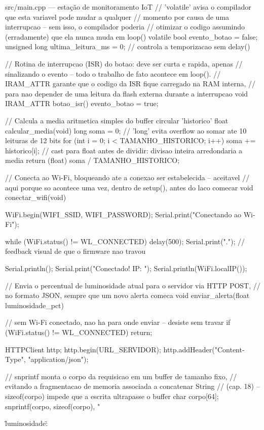 \begin{codigoc}{src/main.cpp — estação de monitoramento IoT}
// 'volatile' avisa o compilador que esta variavel pode mudar a qualquer
// momento por causa de uma interrupcao -- sem isso, o compilador poderia
// otimizar o codigo assumindo (erradamente) que ela nunca muda em loop()
volatile bool evento_botao = false;
unsigned long ultima_leitura_ms = 0;   // controla a temporizacao sem delay()

// Rotina de interrupcao (ISR) do botao: deve ser curta e rapida, apenas
// sinalizando o evento -- todo o trabalho de fato acontece em loop().
// IRAM_ATTR garante que o codigo da ISR fique carregado na RAM interna,
// para nao depender de uma leitura da flash externa durante a interrupcao
void IRAM_ATTR botao_isr() {
    evento_botao = true;
}

// Calcula a media aritmetica simples do buffer circular 'historico'
float calcular_media(void) {
    long soma = 0;   // 'long' evita overflow ao somar ate 10 leituras de 12 bits
    for (int i = 0; i < TAMANHO_HISTORICO; i++) {
        soma += historico[i];
    }
    // cast para float antes de dividir: divisao inteira arredondaria a media
    return (float) soma / TAMANHO_HISTORICO;
}

// Conecta ao Wi-Fi, bloqueando ate a conexao ser estabelecida -- aceitavel
// aqui porque so acontece uma vez, dentro de setup(), antes do laco comecar
void conectar_wifi(void) {
    WiFi.begin(WIFI_SSID, WIFI_PASSWORD);
    Serial.print("Conectando ao Wi-Fi");

    while (WiFi.status() != WL_CONNECTED) {
        delay(500);
        Serial.print(".");   // feedback visual de que o firmware nao travou
    }

    Serial.println();
    Serial.print("Conectado! IP: ");
    Serial.println(WiFi.localIP());
}

// Envia o percentual de luminosidade atual para o servidor via HTTP POST,
// no formato JSON, sempre que um novo alerta comeca
void enviar_alerta(float luminosidade_pct) {
    // sem Wi-Fi conectado, nao ha para onde enviar -- desiste sem travar
    if (WiFi.status() != WL_CONNECTED) {
        return;
    }

    HTTPClient http;
    http.begin(URL_SERVIDOR);
    http.addHeader("Content-Type", "application/json");

    // snprintf monta o corpo da requisicao em um buffer de tamanho fixo,
    // evitando a fragmentacao de memoria associada a concatenar String
    // (cap. 18) -- sizeof(corpo) impede que a escrita ultrapasse o buffer
    char corpo[64];
    snprintf(corpo, sizeof(corpo), "{\"luminosidade\": %

}}
\end{codigoc}
